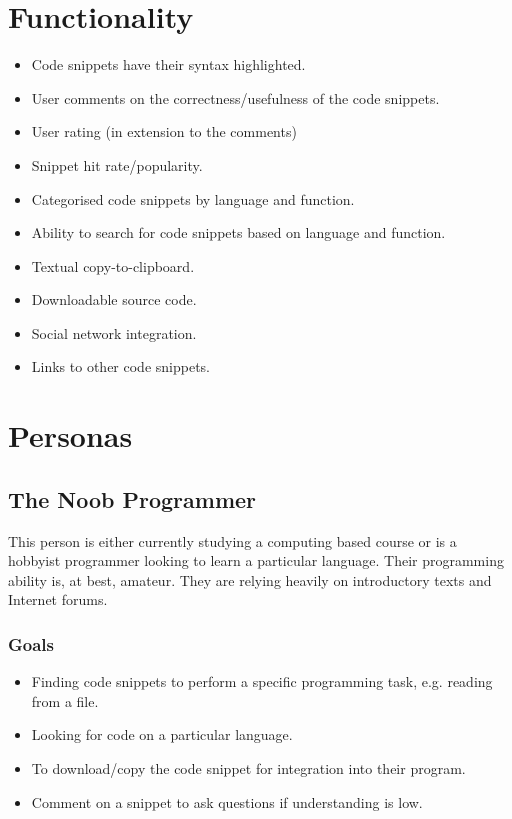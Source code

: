 \documentclass[11pt,a4paper]{article}
\begin{document}
\section{Functionality}

\begin{itemize}
\item Code snippets have their syntax highlighted.
\item User comments on the correctness/usefulness of the code snippets.
\item User rating (in extension to the comments)
\item Snippet hit rate/popularity.
\item Categorised code snippets by language and function.
\item Ability to search for code snippets based on language and function.
\item Textual copy-to-clipboard.
\item Downloadable source code.
\item Social network integration.
\item Links to other code snippets.
\end{itemize}

\newpage

\section{Personas}

\subsection{The Noob Programmer}

This person is either currently studying a computing based course or is a
hobbyist programmer looking to learn a particular language. Their programming
ability is, at best, amateur. They are relying heavily on introductory texts
and Internet forums.

\subsubsection{Goals}

\begin{itemize}
\item Finding code snippets to perform a specific programming task,
e.g. reading from a file.
\item Looking for code on a particular language.
\item To download/copy the code snippet for integration into their
program.
\item Comment on a snippet to ask questions if understanding is low.
\end{itemize}
\end{document}
